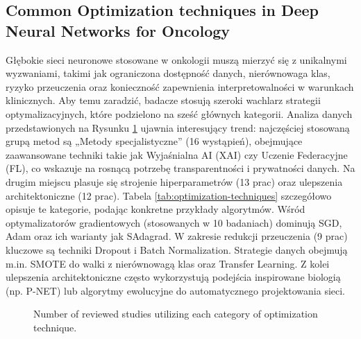\subsection{Common Optimization techniques in Deep Neural Networks for Oncology}
Głębokie sieci neuronowe stosowane w onkologii muszą mierzyć się z unikalnymi wyzwaniami, takimi jak ograniczona dostępność danych, nierównowaga klas, ryzyko przeuczenia oraz konieczność zapewnienia interpretowalności w warunkach klinicznych. Aby temu zaradzić, badacze stosują szeroki wachlarz strategii optymalizacyjnych, które podzielono na sześć głównych kategorii. Analiza danych przedstawionych na Rysunku \ref{fig:optimization-distribution} ujawnia interesujący trend: najczęściej stosowaną grupą metod są „Metody specjalistyczne” (16 wystąpień), obejmujące zaawansowane techniki takie jak Wyjaśnialna AI (XAI) czy Uczenie Federacyjne (FL), co wskazuje na rosnącą potrzebę transparentności i prywatności danych. Na drugim miejscu plasuje się strojenie hiperparametrów (13 prac) oraz ulepszenia architektoniczne (12 prac).
Tabela \ref{tab:optimization-techniques} szczegółowo opisuje te kategorie, podając konkretne przykłady algorytmów. Wśród optymalizatorów gradientowych (stosowanych w 10 badaniach) dominują SGD, Adam oraz ich warianty jak SAdagrad. W zakresie redukcji przeuczenia (9 prac) kluczowe są techniki Dropout i Batch Normalization. Strategie danych obejmują m.in. SMOTE do walki z nierównowagą klas oraz Transfer Learning. Z kolei ulepszenia architektoniczne często wykorzystują podejścia inspirowane biologią (np. P-NET) lub algorytmy ewolucyjne do automatycznego projektowania sieci.

\begin{figure}
\caption{Number of reviewed studies utilizing each category of optimization technique.}
\label{fig:optimization-distribution}
\end{figure}

